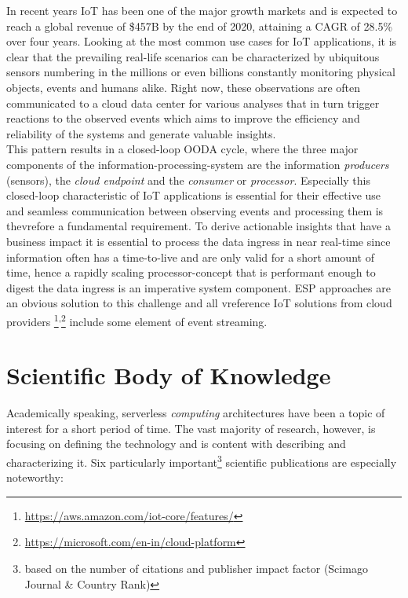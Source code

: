 In recent years \acf{IoT} has been one of the major growth markets and is expected to reach a global revenue of \$457B by the end of 2020\autocite{Columbus20172017Forecasts}, attaining a \acf{CAGR} of 28.5\% over four years.\autocite{Columbus20172017Forecasts} Looking at the most common use cases for IoT applications, it is clear that the prevailing real-life scenarios can be characterized by ubiquitous sensors numbering in the millions or even billions constantly monitoring physical objects, events and humans alike. Right now, these observations are often communicated to a cloud data center for various analyses that in turn trigger reactions to the observed events which aims to improve the efficiency and reliability of the systems and generate valuable insights.\autocite{Yannuzzi2014KeyComputing} \\
This pattern results in a closed-loop \acf{OODA} cycle, where the three major components of the information-processing-system are the information \textit{producers} (sensors), the \textit{cloud endpoint} and the \textit{consumer} or \textit{processor}.\autocite{Shukla2017BenchmarkingApplications} Especially this closed-loop characteristic of IoT applications is essential for their effective use and seamless communication between observing events and processing them is thevrefore a fundamental requirement. To derive actionable insights that have a business impact it is essential to process the data ingress in near real-time since information often has a time-to-live and are only valid for a short amount of time, hence a rapidly scaling processor-concept that is performant enough to digest the data ingress is an imperative system component. \acf{ESP} approaches are an obvious solution to this challenge and all vreference IoT solutions from cloud providers \footnote{\url{https://aws.amazon.com/iot-core/features/}}\textsuperscript{,}\footnote{\url{https://microsoft.com/en-in/cloud-platform}} include some element of event streaming.

\section{Scientific Body of Knowledge}

Academically speaking, serverless \textit{computing} architectures have been a topic of interest for a short period of time. The vast majority of research, however, is focusing on defining the technology and is content with describing and characterizing it. Six particularly important\footnote{based on the number of citations and publisher impact factor (Scimago Journal \& Country Rank)} scientific publications are especially noteworthy:

